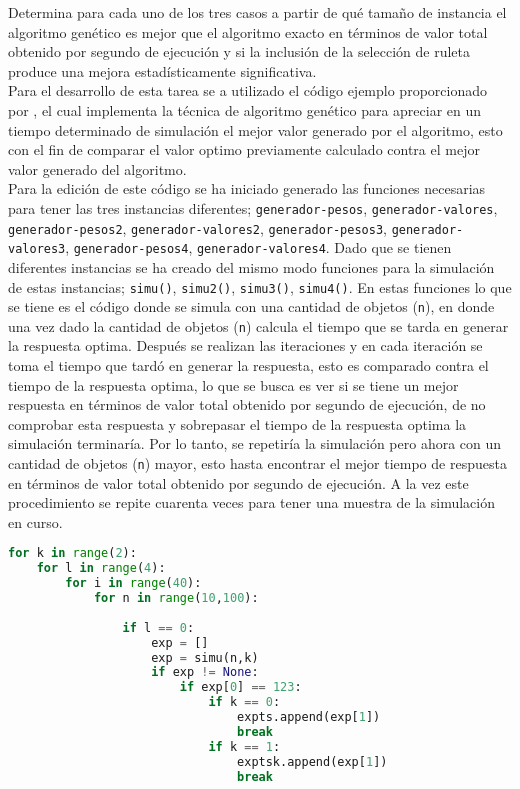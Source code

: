 \documentclass{article}
\begin{document}
Determina para cada uno de los tres casos a partir de qué tamaño de instancia el algoritmo genético es mejor que el algoritmo exacto en términos de valor total obtenido por segundo de ejecución y si la inclusión de la selección de ruleta produce una mejora estadísticamente significativa.\\

Para el desarrollo de esta tarea se a utilizado el código ejemplo proporcionado por \citet{DRA.Code}, el cual implementa la técnica de algoritmo genético para apreciar en un tiempo determinado de simulación el mejor valor generado por el algoritmo, esto con el fin de comparar el valor optimo previamente calculado contra el mejor valor generado del algoritmo.\\  

Para la edición de este código se ha iniciado generado las funciones necesarias para tener las tres instancias diferentes; \texttt{generador-pesos}, \texttt{generador-valores}, \texttt{generador-pesos2}, \texttt{generador-valores2},
\texttt{generador-pesos3}, \texttt{generador-valores3},
\texttt{generador-pesos4}, \texttt{generador-valores4}. Dado que se tienen diferentes instancias se ha creado del mismo modo funciones para la simulación de estas instancias; \texttt{simu()}, \texttt{simu2()}, \texttt{simu3()}, \texttt{simu4()}. En estas funciones lo que se tiene es el código donde se simula con una cantidad de objetos (\texttt{n}), en donde una vez dado la cantidad de objetos (\texttt{n}) calcula el tiempo que se tarda en generar la respuesta optima. Después se realizan las iteraciones y en cada iteración se toma el tiempo que tardó en generar la respuesta, esto es comparado contra el tiempo de la respuesta optima, lo que se busca es ver si se tiene un mejor respuesta en términos de valor total obtenido por segundo de ejecución,  de no comprobar esta respuesta y  sobrepasar el tiempo de la respuesta optima la simulación terminaría. Por lo tanto, se repetiría la simulación pero ahora con un cantidad de objetos (\texttt{n}) mayor, esto hasta encontrar el mejor tiempo de respuesta en términos de valor total obtenido por segundo de ejecución. A la vez este procedimiento se repite cuarenta veces para tener una muestra de la simulación en curso. 

\begin{lstlisting}[language=Python]
for k in range(2):
    for l in range(4):
        for i in range(40):
            for n in range(10,100):
            
                if l == 0:
                    exp = []
                    exp = simu(n,k)
                    if exp != None:
                        if exp[0] == 123:
                            if k == 0:
                                expts.append(exp[1])
                                break
                            if k == 1:
                                exptsk.append(exp[1])
                                break
\end{lstlisting} 
\end{document}
